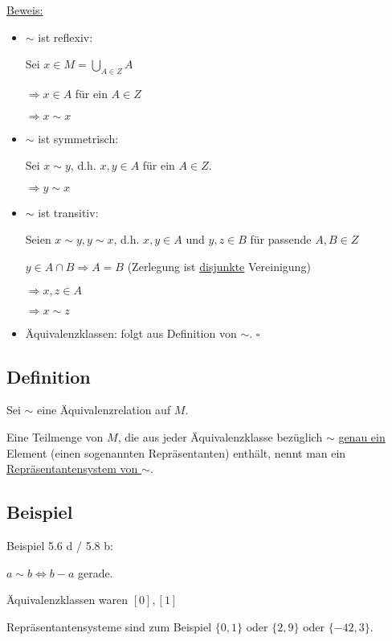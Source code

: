 \documentclass[a4paper, 12pt, twoside] {article}
\begin{document}
\underline{Beweis:} 
\begin{itemize}
\item $\sim$ ist reflexiv:

Sei $x \in M = \displaystyle\bigcup_{A \in Z} A$

$\Rightarrow x \in A$ für ein $A \in Z$

$\Rightarrow x \sim x$

\item $\sim$ ist symmetrisch:

Sei $x \sim y$, d.h. $x,y \in A$ für ein $A \in Z$.

$\Rightarrow y \sim x$

\item $\sim$ ist transitiv:

Seien $x \sim y, y \sim x$, d.h. $x,y \in A$ und $y,z \in B$ für passende $A,B \in Z$

$y \in A \cap B \Rightarrow A = B$ (Zerlegung ist \underline{disjunkte} Vereinigung)

$\Rightarrow x,z \in A$

$\Rightarrow x \sim z$

\item Äquivalenzklassen: folgt aus Definition von $\sim$. \hfill $\square$
\end{itemize}

\subsection{Definition}

Sei $\sim$ eine Äquivalenzrelation auf $M$.

Eine Teilmenge von $M$, die aus jeder Äquivalenzklasse bezüglich $\sim$ \underline{genau ein} Element (einen sogenannten Repräsentanten) enthält, nennt man ein \underline{Repräsentantensystem von $\sim$}.

\subsection{Beispiel}

Beispiel 5.6 d / 5.8 b:

$a \sim b \Leftrightarrow b-a$ gerade.

Äquivalenzklassen waren $[0],[1]$

Repräsentantensysteme sind zum Beispiel $\{0,1\}$ oder $\{2,9\}$ oder $\{-42,3\}$.

\end{document}
